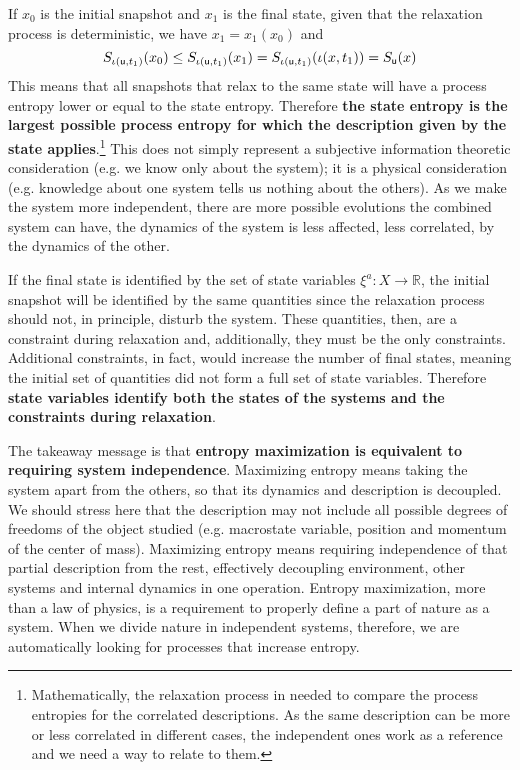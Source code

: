 \documentclass[letterpaper]{article}
\begin{document}
If $x_0$ is the initial snapshot and $x_1$ is the final state, given that the relaxation process is deterministic, we have $x_1= x_1(x_0)$ and 
\begin{equation}
S_{\iota(\stmt[u], t_1)}(x_0) \leq S_{\iota(\stmt[u], t_1)}(x_1) = S_{\iota(\stmt[u], t_1)}(\iota( x, t_1)) = S_{\stmt[u]}(x)
\end{equation}
This means that all snapshots that relax to the same state will have a process entropy lower or equal to the state entropy. Therefore \textbf{the state entropy is the largest possible process entropy for which the description given by the state applies}.\footnote{Mathematically, the relaxation process in needed to compare the process entropies for the correlated descriptions. As the same description can be more or less correlated in different cases, the independent ones work as a reference and we need a way to relate to them.} This does not simply represent a subjective information theoretic consideration (e.g. we know only about the system); it is a physical consideration (e.g. knowledge about one system tells us nothing about the others). As we make the system more independent, there are more possible evolutions the combined system can have, the dynamics of the system is less affected, less correlated, by the dynamics of the other.

If the final state is identified by the set of state variables $\xi^a : X \to \mathbb{R}$, the initial snapshot will be identified by the same quantities since the relaxation process should not, in principle, disturb the system. These quantities, then, are a constraint during relaxation and, additionally, they must be the only constraints. Additional constraints, in fact, would increase the number of final states, meaning the initial set of quantities did not form a full set of state variables. Therefore \textbf{state variables identify both the states of the systems and the constraints during relaxation}.

The takeaway message is that \textbf{entropy maximization is equivalent to requiring system independence}. Maximizing entropy means taking the system apart from the others, so that its dynamics and description is decoupled. We should stress here that the description may not include all possible degrees of freedoms of the object studied (e.g. macrostate variable, position and momentum of the center of mass). Maximizing entropy means requiring independence of that partial description from the rest, effectively decoupling environment, other systems and internal dynamics in one operation. Entropy maximization, more than a law of physics, is a requirement to properly define a part of nature as a system. When we divide nature in independent systems, therefore, we are automatically looking for processes that increase entropy.
 
\end{document}
